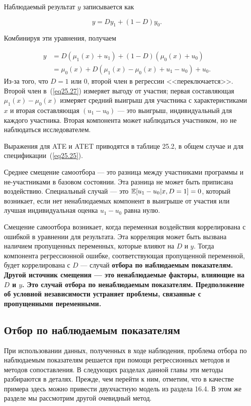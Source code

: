 Наблюдаемый результат $y$ записывается как

\begin{equation}
\label{eq25.26}
y = D y_1 + (1-D) y_0. 
\end{equation}

Комбинируя эти уравнения, получаем

\begin{align}
\label{eq25.27}
y & = D (\mu_1 (x) + u_1) + (1-D)(\mu_0(x) + u_0) \nonumber \\
& =  \mu_0 (x) + D(\mu_1 (x) - \mu_0 (x) + u_1 - u_0) + u_0. 
\end{align}
Из-за того, что $D = 1$ или $0$, второй член в регрессии <<переключается>>. Второй член в~(\ref{eq25.27}) измеряет выгоду от участия; первая составляющая $\mu_1(x) - \mu_0(x)$ измеряет средний выигрыш для участника с характеристиками $x$ и вторая составляющая $(u_1 - u_0)$ --- это выигрыш, индивидуальный для каждого участника. Вторая компонента может наблюдаться участником, но не наблюдаться исследователем. 

Выражения для ATE и ATET приводятся в таблице 25.2, в общем случае и для спецификации~(\ref{eq25.25}). 

Среднее смещение самоотбора --- это разница между участниками программы и не-участниками в базовом состоянии. Эта разница не может быть приписана воздействию. Специальный случай --- это $\mathbb{E} [u_1 - u_0 | x, D = 1] = 0$, который возникает, если нет ненаблюдаемых компонент в выигрыше от участия или лучшая индивидуальная оценка $u_1 - u_0$ равна нулю. 

Смещение самоотбора возникает, когда переменная воздействия коррелирована с ошибкой в уравнении для результата. Эта корреляция может быть вызвана наличием пропущенных переменных, которые влияют на $D$ и $y$. Тогда компонента регрессионной ошибке, соответствующая пропущенной переменной, будет коррелирована  с $D$ --- случай \bfseries отбора по наблюдаемым показателям. \mdseries Другой источник смещения --- это ненаблюдаемые факторы, влияющие на $D$ и $y$. Это случай \bfseries отбора по ненаблюдаемым показателям. \mdseries Предположение об условной независимости устраняет проблемы, связанные с пропущенными переменными. 

\subsection{Отбор по наблюдаемым показателям}

При использовании данных, полученных в ходе наблюдения, проблема отбора по наблюдаемым показателям решается при помощи регрессионных методов и методов сопоставления. В следующих разделах данной главы эти методы разбираются в деталях. Прежде, чем перейти к ним, отметим, что в качестве примера здесь можно привести двухчастную модель из раздела 16.4. В этом же разделе мы рассмотрим другой очевидный метод. 

